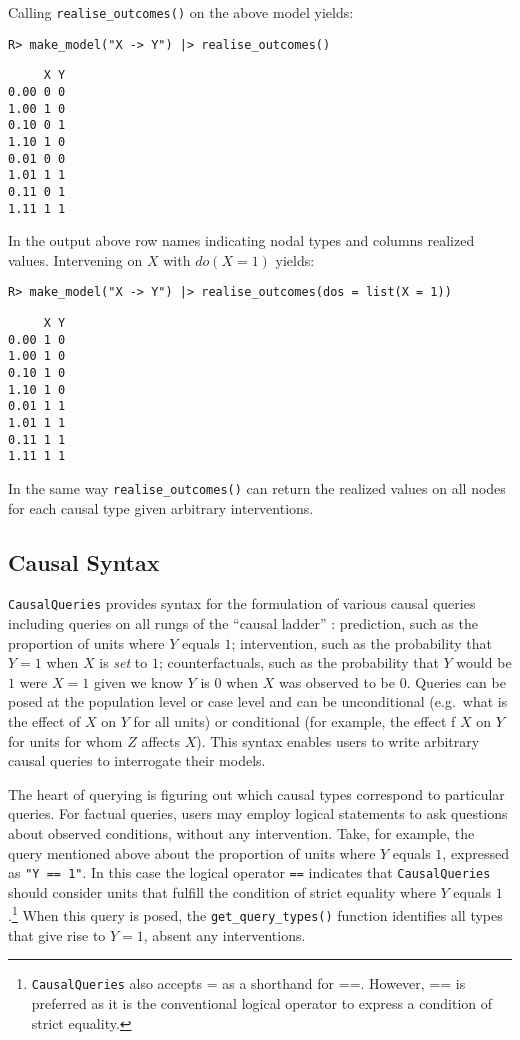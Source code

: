 \documentclass[
  11pt,
  article]{jss}
\begin{document}
Calling \texttt{realise\_outcomes()} on the above model yields:

\begin{verbatim}
R> make_model("X -> Y") |> realise_outcomes()
\end{verbatim}

\begin{verbatim}
     X Y
0.00 0 0
1.00 1 0
0.10 0 1
1.10 1 0
0.01 0 0
1.01 1 1
0.11 0 1
1.11 1 1
\end{verbatim}

In the output above row names indicating nodal types and columns
realized values. Intervening on \(X\)
\citep[see][]{pearl_causality_2009} with \(do(X=1)\) yields:

\begin{verbatim}
R> make_model("X -> Y") |> realise_outcomes(dos = list(X = 1))
\end{verbatim}

\begin{verbatim}
     X Y
0.00 1 0
1.00 1 0
0.10 1 0
1.10 1 0
0.01 1 1
1.01 1 1
0.11 1 1
1.11 1 1
\end{verbatim}

In the same way \texttt{realise\_outcomes()} can return the realized
values on all nodes for each causal type given arbitrary interventions.

\hypertarget{sec-syntax}{%
\subsection{Causal Syntax}\label{sec-syntax}}

\texttt{CausalQueries} provides syntax for the formulation of various
causal queries including queries on all rungs of the ``causal ladder''
\citep{pearl_causality_2009}: prediction, such as the proportion of
units where \(Y\) equals \(1\); intervention, such as the probability
that \(Y = 1\) when \(X\) is \emph{set} to \(1\); counterfactuals, such
as the probability that \(Y\) would be \(1\) were \(X = 1\) given we
know \(Y\) is \(0\) when \(X\) was observed to be \(0\). Queries can be
posed at the population level or case level and can be unconditional
(e.g.~what is the effect of \(X\) on \(Y\) for all units) or conditional
(for example, the effect f \(X\) on \(Y\) for units for whom \(Z\)
affects \(X\)). This syntax enables users to write arbitrary causal
queries to interrogate their models.

The heart of querying is figuring out which causal types correspond to
particular queries. For factual queries, users may employ logical
statements to ask questions about observed conditions, without any
intervention. Take, for example, the query mentioned above about the
proportion of units where \(Y\) equals \(1\), expressed as
\texttt{"Y\ ==\ 1"}. In this case the logical operator \texttt{==}
indicates that \texttt{CausalQueries} should consider units that fulfill
the condition of strict equality where \(Y\) equals \(1\).\footnote{\texttt{CausalQueries}
  also accepts = as a shorthand for ==. However, == is preferred as it
  is the conventional logical operator to express a condition of strict
  equality.} When this query is posed, the \texttt{get\_query\_types()}
function identifies all types that give rise to \(Y=1\), absent any
interventions.
\end{document}
